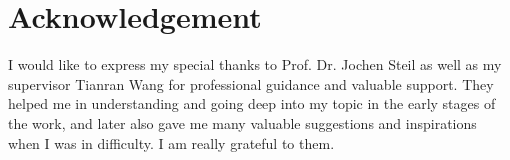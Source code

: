 \chapter*{Acknowledgement}

I would like to express my special thanks to Prof. Dr. Jochen Steil as well as my supervisor Tianran Wang for professional guidance and valuable support. They helped me in understanding and going deep into my topic in the early stages of the work, and later also gave me many valuable suggestions and inspirations when I was in difficulty. I am really grateful to them.